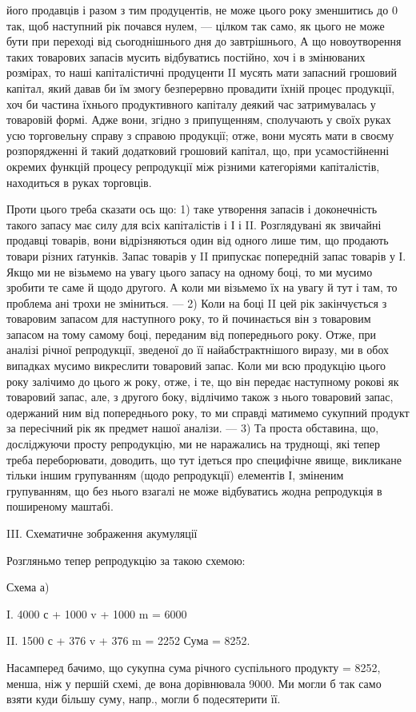 \parcont{}  %
його продавців і разом з тим продуцентів, не може цього року зменшитись
до 0 так, щоб наступний рік почався нулем, — цілком так само, як
цього не може бути при переході від сьогоднішнього дня до завтрішнього,
А що новоутворення таких товарових запасів мусить відбуватись постійно,
хоч і в змінюваних розмірах, то наші капіталістичні продуценти II мусять
мати запасний грошовий капітал, який давав би їм змогу безперервно
провадити їхній процес продукції, хоч би частина їхнього продуктивного
капіталу деякий час затримувалась у товаровій формі. Адже вони, згідно
з припущенням, сполучають у своїх руках усю торговельну справу
з справою продукції; отже, вони мусять мати в своєму розпорядженні
й такий додатковий грошовий капітал, що, при усамостійненні окремих
функцій процесу репродукції між різними категоріями капіталістів, находиться
в руках торговців.

Проти цього треба сказати ось що: 1) таке утворення запасів і доконечність
такого запасу має силу для всіх капіталістів і І і II. Розглядувані
як звичайні продавці товарів, вони відрізняються один від одного
лише тим, що продають товари різних ґатунків. Запас товарів у II припускає
попередній запас товарів у І. Якщо ми не візьмемо на увагу
цього запасу на одному боці, то ми мусимо зробити те саме й щодо
другого. А коли ми візьмемо їх на увагу й тут і там, то проблема ані
трохи не зміниться. — 2) Коли на боці II цей рік закінчується з товаровим
запасом для наступного року, то й починається він з товаровим запасом
на тому самому боці, переданим від попереднього року.
Отже, при аналізі річної репродукції, зведеної до її найабстрактнішого виразу,
ми в обох випадках мусимо викреслити товаровий запас. Коли ми всю
продукцію цього року залічимо до цього ж року, отже, і те, що він передає
наступному рокові як товаровий запас, але, з другого боку, відлічимо
також з нього товаровий запас, одержаний ним від попереднього року,
то ми справді матимемо сукупний продукт за пересічний рік як предмет
нашої аналізи. — 3) Та проста обставина, що, досліджуючи просту
репродукцію, ми не наражались на труднощі, які тепер треба переборювати,
доводить, що тут ідеться про специфічне явище, викликане тільки
іншим групуванням (щодо репродукції) елементів І, зміненим групуванням,
що без нього взагалі не може відбуватись жодна репродукція в поширеному
маштабі.

III. Схематичне зображення акумуляції

Розгляньмо тепер репродукцію за такою схемою:

Схема а)

I.    4000 с + 1000 v + 1000 m = 6000

II.    1500 с + 376 v + 376 m = 2252  Сума = 8252.

Насамперед бачимо, що сукупна сума річного суспільного продукту
= 8252, менша, ніж у першій схемі, де вона дорівнювала 9000.
Ми могли б так само взяти куди більшу суму, напр., могли б подесятерити її.
\parbreak{}  %
